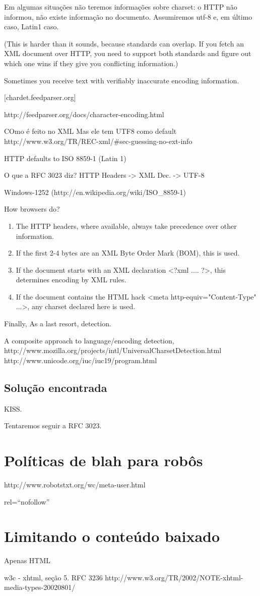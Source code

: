 Em algumas situações não teremos informações sobre charset: o HTTP não
informou, não existe informação no documento. Assumiremos utf-8 e, em
último caso, Latin1 caso.

    (This is harder than it sounds, because standards can overlap. If
    you fetch an XML document over HTTP, you need to support both
    standards and figure out which one wins if they give you conflicting
    information.)
    
    Sometimes you receive text with verifiably inaccurate encoding information.
    
    [chardet.feedparser.org]


http://feedparser.org/docs/character-encoding.html

    COmo é feito no XML
        Mas ele tem UTF8 como default
        http://www.w3.org/TR/REC-xml/#sec-guessing-no-ext-info

    HTTP defaults to ISO 8859-1 (Latin 1)

    O que a RFC 3023 diz? HTTP  Headers -> XML Dec. -> UTF-8


Windows-1252 (http://en.wikipedia.org/wiki/ISO_8859-1)

How browsers do?

\begin{enumerate}
\item The HTTP headers, where available, always take precedence over other information.
\item  If the first 2-4 bytes are an XML Byte Order Mark (BOM), this is used.
\item  If the document starts with an XML declaration <?xml .... ?>, this determines encoding by XML rules.
 \item If the document contains the HTML hack <meta http-equiv="Content-Type" ...>, any charset declared here is used.
\end{enumerate}

Finally, As a last resort, detection.

A composite approach to language/encoding detection,
    http://www.mozilla.org/projects/intl/UniversalCharsetDetection.html
    http://www.unicode.org/iuc/iuc19/program.html

\subsection{Solução encontrada}

KISS.

Tentaremos seguir a RFC 3023.
\section{Políticas de blah para robôs}
http://www.robotstxt.org/wc/meta-user.html

rel=``nofollow''



\section{Limitando o conteúdo baixado}

Apenas HTML 

w3c - xhtml, seção 5.
RFC 3236
http://www.w3.org/TR/2002/NOTE-xhtml-media-types-20020801/
